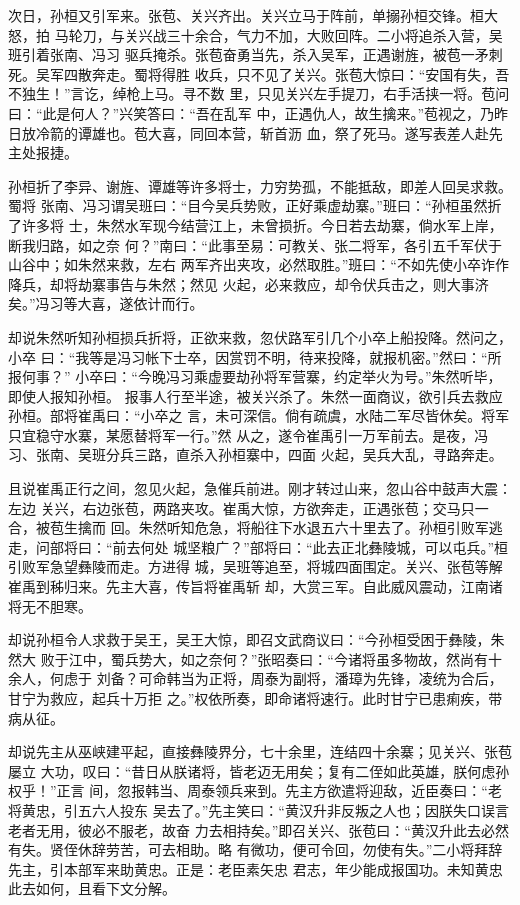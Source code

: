 次日，孙桓又引军来。张苞、关兴齐出。关兴立马于阵前，单搦孙桓交锋。桓大怒，拍
马轮刀，与关兴战三十余合，气力不加，大败回阵。二小将追杀入营，吴班引着张南、冯习
驱兵掩杀。张苞奋勇当先，杀入吴军，正遇谢旌，被苞一矛刺死。吴军四散奔走。蜀将得胜
收兵，只不见了关兴。张苞大惊曰：“安国有失，吾不独生！”言讫，绰枪上马。寻不数
里，只见关兴左手提刀，右手活挟一将。苞问曰：“此是何人？”兴笑答曰：“吾在乱军
中，正遇仇人，故生擒来。”苞视之，乃昨日放冷箭的谭雄也。苞大喜，同回本营，斩首沥
血，祭了死马。遂写表差人赴先主处报捷。

孙桓折了李异、谢旌、谭雄等许多将士，力穷势孤，不能抵敌，即差人回吴求救。蜀将
张南、冯习谓吴班曰：“目今吴兵势败，正好乘虚劫寨。”班曰：“孙桓虽然折了许多将
士，朱然水军现今结营江上，未曾损折。今日若去劫寨，倘水军上岸，断我归路，如之奈
何？”南曰：“此事至易：可教关、张二将军，各引五千军伏于山谷中；如朱然来救，左右
两军齐出夹攻，必然取胜。”班曰：“不如先使小卒诈作降兵，却将劫寨事告与朱然；然见
火起，必来救应，却令伏兵击之，则大事济矣。”冯习等大喜，遂依计而行。

却说朱然听知孙桓损兵折将，正欲来救，忽伏路军引几个小卒上船投降。然问之，小卒
曰：“我等是冯习帐下士卒，因赏罚不明，待来投降，就报机密。”然曰：“所报何事？”
小卒曰：“今晚冯习乘虚要劫孙将军营寨，约定举火为号。”朱然听毕，即使人报知孙桓。
报事人行至半途，被关兴杀了。朱然一面商议，欲引兵去救应孙桓。部将崔禹曰：“小卒之
言，未可深信。倘有疏虞，水陆二军尽皆休矣。将军只宜稳守水寨，某愿替将军一行。”然
从之，遂令崔禹引一万军前去。是夜，冯习、张南、吴班分兵三路，直杀入孙桓寨中，四面
火起，吴兵大乱，寻路奔走。

且说崔禹正行之间，忽见火起，急催兵前进。刚才转过山来，忽山谷中鼓声大震：左边
关兴，右边张苞，两路夹攻。崔禹大惊，方欲奔走，正遇张苞；交马只一合，被苞生擒而
回。朱然听知危急，将船往下水退五六十里去了。孙桓引败军逃走，问部将曰：“前去何处
城坚粮广？”部将曰：“此去正北彝陵城，可以屯兵。”桓引败军急望彝陵而走。方进得
城，吴班等追至，将城四面围定。关兴、张苞等解崔禹到秭归来。先主大喜，传旨将崔禹斩
却，大赏三军。自此威风震动，江南诸将无不胆寒。

却说孙桓令人求救于吴王，吴王大惊，即召文武商议曰：“今孙桓受困于彝陵，朱然大
败于江中，蜀兵势大，如之奈何？”张昭奏曰：“今诸将虽多物故，然尚有十余人，何虑于
刘备？可命韩当为正将，周泰为副将，潘璋为先锋，凌统为合后，甘宁为救应，起兵十万拒
之。”权依所奏，即命诸将速行。此时甘宁已患痢疾，带病从征。

却说先主从巫峡建平起，直接彝陵界分，七十余里，连结四十余寨；见关兴、张苞屡立
大功，叹曰：“昔日从朕诸将，皆老迈无用矣；复有二侄如此英雄，朕何虑孙权乎！”正言
间，忽报韩当、周泰领兵来到。先主方欲遣将迎敌，近臣奏曰：“老将黄忠，引五六人投东
吴去了。”先主笑曰：“黄汉升非反叛之人也；因朕失口误言老者无用，彼必不服老，故奋
力去相持矣。”即召关兴、张苞曰：“黄汉升此去必然有失。贤侄休辞劳苦，可去相助。略
有微功，便可令回，勿使有失。”二小将拜辞先主，引本部军来助黄忠。正是：老臣素矢忠
君志，年少能成报国功。未知黄忠此去如何，且看下文分解。